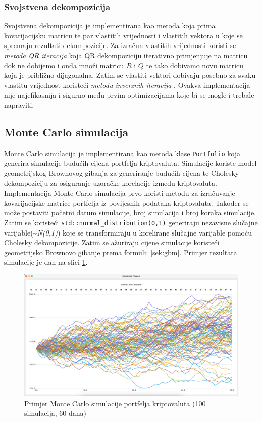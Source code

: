 \documentclass[zavrsnirad]{fer}
\begin{document}
\subsubsection{Svojstvena dekompozicija}
\label{sek:svojstvena_dekompozicija}
Svojstvena dekompozicija je implementirana kao metoda koja prima
kovarijacijsku matricu te par vlastitih vrijednosti i vlastitih vektora u koje
se spremaju rezultati dekompozicije.
Za izračun vlastitih vrijednosti koristi se \emph{metoda QR iteracija}
\cite{NLA} koja QR dekompoziciju
iterativno primjenjuje na matricu dok ne dobijemo i onda množi
matricu $R$ i $Q$ te tako dobivamo novu matricu koja je
približno dijagonalna. Zatim se vlastiti vektori dobivaju
posebno za svaku vlastitu vrijednost koristeći \emph{metodu
inverznih iteracija} \cite{NLA}. Ovakva implementacija nije
najefikasnija i sigurno među prvim optimizacijama koje bi se mogle
i trebale napraviti.




\subsection{Monte Carlo simulacija}
\label{sek:monte_carlo_simulacija}
Monte Carlo simulacija je implementirana kao metoda klase
\texttt{Portfolio} koja generira simulacije budućih cijena portfelja
kriptovaluta. Simulacije koriste model geometrijskog Brownovog gibanja
za generiranje budućih cijena te Cholesky dekompoziciju za
osiguranje uzoračke korelacije između kriptovaluta.
Implementacija Monte Carlo simulacija prvo koristi metodu za izračuvanje
kovarijacijske matrice portfelja iz povijesnih podataka kriptovaluta.
Također se može postaviti početni datum simulacije, broj simulacija i
broj koraka simulacije.
Zatim se koristeći \texttt{std::normal\_distribution(0,1)} generiraju
nezavisne slučajne varijable(\textasciitilde \textit{N(0,1)}) koje se
transformiraju u korelirane slučajne varijable pomoću Cholesky dekompozicije.
Zatim se ažuriraju cijene simulacije koristeći geometrijsko Brownovo gibanje
prema formuli:
\ref{sek:gbm}. Primjer rezultata simulacije je dan na slici
\ref{fig:monte_carlo_example}.
\begin{figure}[H]
    \centering
    \includegraphics[width=1.0\textwidth]{Figures/monte_carlo_example.png}
    \caption{Primjer Monte Carlo simulacije portfelja kriptovaluta (100
    simulacija, 60 dana)}
    \label{fig:monte_carlo_example}
\end{figure}
\end{document}
